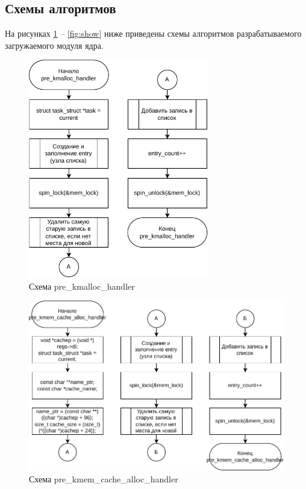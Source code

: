 \newpage

\subsection{Схемы алгоритмов}

На рисунках \ref{fig:kmalloc} -- \ref{fig:show} ниже приведены схемы алгоритмов разрабатываемого загружаемого модуля ядра.

\begin{figure}[H]
	\centering
	\includegraphics[width=0.7\textwidth]{diag/kmalloc.pdf}
	\caption{Схема pre\_kmalloc\_handler}
	\label{fig:kmalloc}
\end{figure}

\begin{figure}[H]
	\centering
	\includegraphics[width=\textwidth]{diag/kmem-cache.pdf}
	\caption{Схема pre\_kmem\_cache\_alloc\_handler}
	\label{fig:kmem}
\end{figure}


